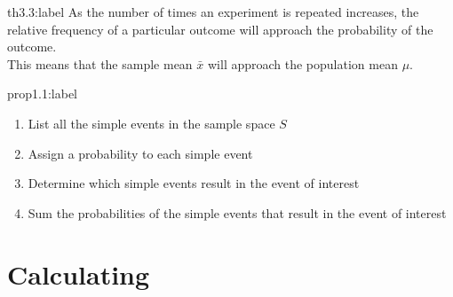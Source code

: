 \begin{theorem}{th3.3:label}
    As the number of times an experiment is repeated increases, the relative frequency of a particular outcome will approach the probability of the outcome. \\

    This means that the sample mean $\bar{x}$ will approach the population mean $\mu$.
\end{theorem}

\begin{proposition}{prop1.1:label}
    \begin{enumerate}
        \item List all the simple events in the sample space $S$
        \item Assign a probability to each simple event
        \item Determine which simple events result in the event of interest
        \item Sum the probabilities of the simple events that result in the event of interest
    \end{enumerate}
\end{proposition}


\section{Calculating }